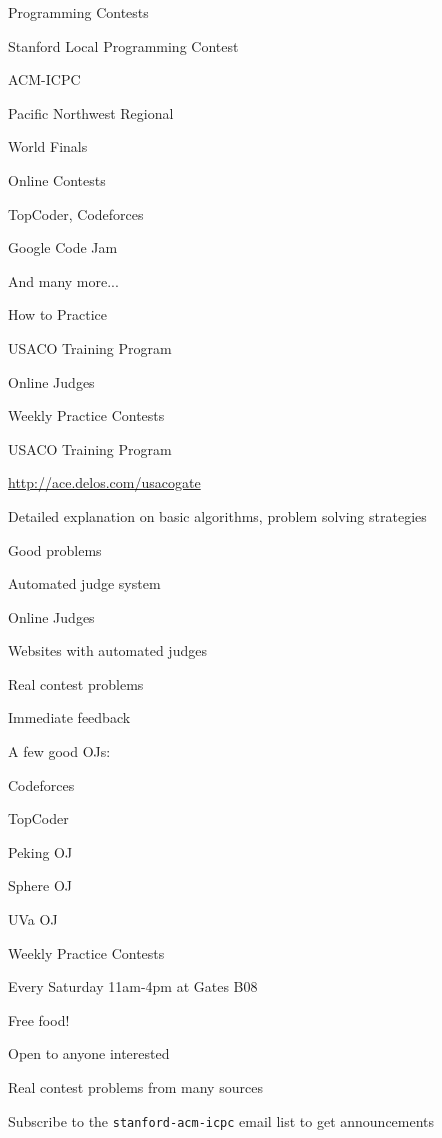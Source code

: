 \documentclass[10pt,onlymath]{beamer}
\begin{document}
\begin{frame}{Programming Contests}
\BIT
\item Stanford Local Programming Contest
\item ACM-ICPC
\BIT
\item Pacific Northwest Regional
\item World Finals
\EIT
\item Online Contests
\BIT
\item TopCoder, Codeforces
\item Google Code Jam
\EIT
\item And many more...
\EIT
\end{frame}

\begin{frame} {How to Practice}
\BIT
\item USACO Training Program
\item Online Judges
\item Weekly Practice Contests
\EIT
\end{frame}

\begin{frame} {USACO Training Program}
\BIT
\item \url{http://ace.delos.com/usacogate}
\item Detailed explanation on basic algorithms, problem solving strategies
\item Good problems
\item Automated judge system
\EIT
\end{frame}

\begin{frame} {Online Judges}
\BIT
\item Websites with automated judges
\BIT
\item Real contest problems
\item Immediate feedback
\EIT
\item A few good OJs:
\BIT
\item Codeforces
\item TopCoder
\item Peking OJ
\item Sphere OJ
\item UVa OJ
\EIT
\EIT
\end{frame}

\begin{frame} {Weekly Practice Contests}
\BIT
\item Every Saturday 11am-4pm at Gates B08
\BIT
\item Free food!
\EIT
\item Open to anyone interested
\item Real contest problems from many sources
\item Subscribe to the \texttt{stanford-acm-icpc} email list to get announcements
\EIT
\end{frame}
\end{document}
